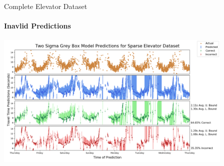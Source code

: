 \documentclass{beamer}
\begin{document}
\begin{frame}[t]{Complete Elevator Dataset}
  \framesubtitle{Inavlid Predictions}

  {\includegraphics[width = 4.5in]{images/elevator/two_sigma_grey_box_model_predictions_for_sparse_elevator_dataset.png}}

\end{frame}
\end{document}
